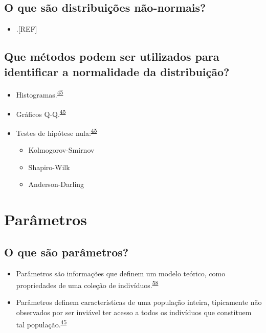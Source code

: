 \documentclass[
  a4paper,
]{book}
\providecommand{\tightlist}{%
  \setlength{\itemsep}{0pt}\setlength{\parskip}{0pt}}
\begin{document}
\hypertarget{o-que-suxe3o-distribuiuxe7uxf5es-nuxe3o-normais}{%
\subsection{O que são distribuições não-normais?}\label{o-que-suxe3o-distribuiuxe7uxf5es-nuxe3o-normais}}

\begin{itemize}
\tightlist
\item
  .{[}REF{]}
\end{itemize}

\hypertarget{que-muxe9todos-podem-ser-utilizados-para-identificar-a-normalidade-da-distribuiuxe7uxe3o}{%
\subsection{Que métodos podem ser utilizados para identificar a normalidade da distribuição?}\label{que-muxe9todos-podem-ser-utilizados-para-identificar-a-normalidade-da-distribuiuxe7uxe3o}}

\begin{itemize}
\item
  Histogramas.\textsuperscript{\protect\hyperlink{ref-vetter2017}{45}}
\item
  Gráficos Q-Q.\textsuperscript{\protect\hyperlink{ref-vetter2017}{45}}
\item
  Testes de hipótese nula:\textsuperscript{\protect\hyperlink{ref-vetter2017}{45}}

  \begin{itemize}
  \item
    Kolmogorov-Smirnov
  \item
    Shapiro-Wilk
  \item
    Anderson-Darling
  \end{itemize}
\end{itemize}

\hypertarget{parametros}{%
\section{Parâmetros}\label{parametros}}

\hypertarget{o-que-suxe3o-paruxe2metros}{%
\subsection{O que são parâmetros?}\label{o-que-suxe3o-paruxe2metros}}

\begin{itemize}
\item
  Parâmetros são informações que definem um modelo teórico, como propriedades de uma coleção de indivíduos.\textsuperscript{\protect\hyperlink{ref-Altman1999}{58}}
\item
  Parâmetros definem características de uma população inteira, tipicamente não observados por ser inviável ter acesso a todos os indivíduos que constituem tal população.\textsuperscript{\protect\hyperlink{ref-vetter2017}{45}}
\end{itemize}
\end{document}
